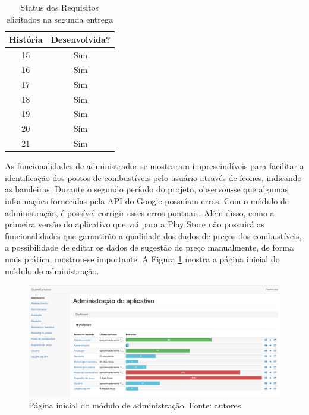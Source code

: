 \begin{table}[H]
\centering
\caption{Status dos Requisitos elicitados na segunda entrega}
\label{tab:req-2}
\begin{tabular}{|c|c|}
\hline
\textbf{História} & \textbf{Desenvolvida?} \\ \hline
15                & Sim                    \\ \hline
16                & Sim                    \\ \hline
17                & Sim                    \\ \hline
18                & Sim                    \\ \hline
19                & Sim                    \\ \hline
20                & Sim                    \\ \hline
21                & Sim                    \\ \hline
\end{tabular}
\end{table}

As funcionalidades de administrador se mostraram imprescindíveis para facilitar a identificação dos postos de combustíveis pelo usuário através de ícones, indicando as bandeiras. Durante o segundo período do projeto, observou-se que algumas informações fornecidas pela API do Google possuíam erros. Com o módulo de administração, é possível corrigir esses erros pontuais. Além disso, como a primeira versão do aplicativo que vai para a Play Store não possuirá as funcionalidades que garantirão a qualidade dos dados de preços dos combustíveis, a possibilidade de editar os dados de sugestão de preço manualmente, de forma mais prática, mostrou-se importante. A Figura \ref{img:admin-1} mostra a página inicial do módulo de administração.

\begin{figure}[H]
    \centering
    \includegraphics[scale=0.32]{figuras/admin-1.png}
    \caption[Página inicial do módulo de administração]{Página inicial do módulo de administração. Fonte: autores}
    \label{img:admin-1}
\end{figure}

